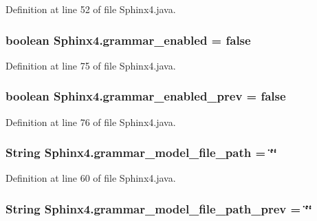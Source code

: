 Definition at line 52 of file Sphinx4.\-java.

\hypertarget{classSphinx4_a20f0d9d8646e97cd64d675957eb0a8ec}{
\subsubsection[{grammar\-\_\-enabled}]{\setlength{\rightskip}{0pt plus 5cm}boolean Sphinx4.\-grammar\-\_\-enabled = false\hspace{0.3cm}{\ttfamily [static]}}}\label{classSphinx4_a20f0d9d8646e97cd64d675957eb0a8ec}


Definition at line 75 of file Sphinx4.\-java.

\hypertarget{classSphinx4_a3830508de85cfcde2b71c019b9b645da}{
\subsubsection[{grammar\-\_\-enabled\-\_\-prev}]{\setlength{\rightskip}{0pt plus 5cm}boolean Sphinx4.\-grammar\-\_\-enabled\-\_\-prev = false\hspace{0.3cm}{\ttfamily [static]}}}\label{classSphinx4_a3830508de85cfcde2b71c019b9b645da}


Definition at line 76 of file Sphinx4.\-java.

\hypertarget{classSphinx4_a3913defdceb57d6ecd4dca0e2d83f4b9}{
\subsubsection[{grammar\-\_\-model\-\_\-file\-\_\-path}]{\setlength{\rightskip}{0pt plus 5cm}String Sphinx4.\-grammar\-\_\-model\-\_\-file\-\_\-path = \char`\"{}\char`\"{}\hspace{0.3cm}{\ttfamily [static]}}}\label{classSphinx4_a3913defdceb57d6ecd4dca0e2d83f4b9}


Definition at line 60 of file Sphinx4.\-java.

\hypertarget{classSphinx4_aed95605805711285385e0baa12c5d1dd}{
\subsubsection[{grammar\-\_\-model\-\_\-file\-\_\-path\-\_\-prev}]{\setlength{\rightskip}{0pt plus 5cm}String Sphinx4.\-grammar\-\_\-model\-\_\-file\-\_\-path\-\_\-prev = \char`\"{}\char`\"{}\hspace{0.3cm}{\ttfamily [static]}}}\label{classSphinx4_aed95605805711285385e0baa12c5d1dd}



